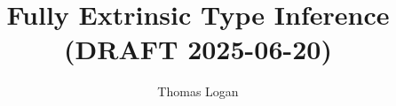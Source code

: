 \documentclass[table,dvipsnames,acmsmall]{acmart}
\title{Fully Extrinsic Type Inference (DRAFT 2025-06-20)}
\author{Thomas Logan}
\newcounter{pdc}
\newcounter{sdc}
\theoremstyle{definition}
\begin{document}
\newcommand{\stoprule}{
  \addlinespace[2pt]
  \toprule
  \addlinespace[5pt]
}

\newcommand{\sbottomrule}{
  \addlinespace[2pt]
  \bottomrule
  \addlinespace[2pt]
}

\newcommand{\smidrule}[1]{
  \addlinespace[2pt]
  \midrule
  \addlinespace[2pt]
}

\newcommand{\scmidrule}[1]{
  \addlinespace[2pt]
  \cmidrule{#1}
  \addlinespace[2pt]
}


\newcommand{\sline}{
  \arrayrulecolor{gray!50}
  \specialrule{0.4pt}{2pt}{2pt}
  \arrayrulecolor{black}
}

\newcommand{\pdc}{\stepcounter{pdc}\arabic{pdc}}
\newcommand{\sdc}{\stepcounter{sdc}\arabic{sdc}}

\newcommand{\Par}[1]{\paragraph{\textbf{#1}}}
\newcommand{\J}[1]{\texttt{\fontfamily{pcr}\selectfont #1}}
\newcommand{\lab}[1]{\text{\color{Gray}\ [#1]}}
\newcommand{\entails}{\vdash}
\newcommand{\satisfies}{\vDash}
\newcommand{\given}{\dashv}

\newcommand{\inflatable}{\star}

\newcommand{\cmark}{\ding{51}}%
\newcommand{\xmark}{\ding{55}}%
\newcommand{\pass}{\text{\scriptsize \color{Green} \ding{51}}}
\newcommand{\assisted}{\text{\scriptsize \color{Purple} \ding{45}}}
\newcommand{\fail}{\text{\scriptsize \color{red} \ding{55}}}

\newcommand{\qua}{\ .\ }



\newcommand{\ignore}{\varnothing}
\newcommand{\dTheta}{\dot{\Theta}}
\newcommand{\closed}{\bullet}
\newcommand{\local}{\blacktriangle}
\newcommand{\open}{\circ}



\newcommand{\up}{\ \land\ }
\newcommand{\down}{\ \lor\ }


\newcommand{\multi}[1]{\widebar{\ #1\ }}
\newcommand{\hastype}{:}
\newcommand{\pattype}{\ \lozenge\ }
\newcommand{\restricted}{\ \blacklozenge\ }
\newcommand{\dentails}{\Vdash}
\newcommand{\liftfun}{:}

\newcommand{\sz}[1]{\text{\small #1}}


\newcommand{\nopad}{
  \setlength{\abovedisplayskip}{4pt}
  \setlength{\belowdisplayskip}{4pt}
}
\end{document}
